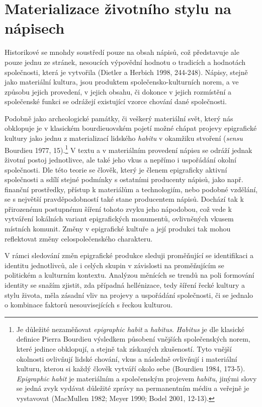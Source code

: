 \section[materializace-životního-stylu-na-nápisech]{Materializace životního stylu na nápisech}

Historikové se mnohdy soustředí pouze na obsah nápisů, což představuje ale pouze jednu ze stránek, nesoucích výpovědní hodnotu o tradicích a hodnotách společnosti, která je vytvořila (Dietler a Herbich 1998, 244-248). Nápisy, stejně jako materiální kultura, jsou produktem společensko-kulturních norem, a ve způsobu jejich provedení, v jejich obsahu, či dokonce v jejich rozmístění a společenské funkci se odrážejí existující vzorce chování dané společnosti.

Podobně jako archeologické památky, či veškerý materiální svět, který nás obklopuje je v klasickém bourdieuovském pojetí možné chápat projevy epigrafické kultury jako jednu z materializací lidského {\em habitu} v okamžiku stvoření ({\em sensu} Bourdieu 1977, 15).\footnote{Je důležité nezaměňovat {\em epigraphic habit} a {\em habitus}. {\em Habitus} je dle klasické definice Pierra Bourdieu výsledkem působení vnějších společenských norem, které jedince obklopují, a stejně tak získaných zkušeností. Tyto vnější okolnosti ovlivňují lidské chování, vkus a následně ovlivňují i materiální kulturu, kterou si každý člověk vytváří okolo sebe (Bourdieu 1984, 173-5). {\em Epigraphic habit} je materiálním a společenským projevem {\em habitu}, jinými slovy se jedná zvyk vydávat důležité zprávy na permanentním médiu a veřejně je vystavovat (MacMullen 1982; Meyer 1990; Bodel 2001, 12-13).} V textu a v materiálním provedení nápisu se odráží jednak životní postoj jednotlivce, ale také jeho vkus a nepřímo i uspořádání okolní společnosti. Dle této teorie se člověk, který je členem epigraficky aktivní společnosti a sdílí stejné podmínky s ostatními producenty nápisů, jako např. finanční prostředky, přístup k materiálům a technologiím, nebo podobné vzdělání, se s největší pravděpodobností také stane producentem nápisů. Dochází tak k přirozenému postupnému šíření tohoto zvyku jeho nápodobou, což vede k vytváření lokálních variant epigrafických monumentů, ovlivněných vkusem místních komunit. Změny v epigrafické kultuře a její produkci tak mohou reflektovat změny celospolečenského charakteru.

V rámci sledování změn epigrafické produkce sleduji proměňující se identifikaci a identitu jednotlivců, ale i celých skupin v závislosti na proměňujícím se politickém a kulturním kontextu. Analýzou měnících se trendů na poli formování identity se snažím zjistit, zda případná hellénizace, tedy šíření řecké kultury a stylu života, měla zásadní vliv na projevy a uspořádání společnosti, či se jednalo o kombinace faktorů nesouvisejících s řeckou kulturou.

